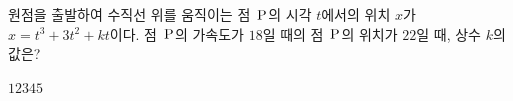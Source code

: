 원점을 출발하여 수직선 위를 움직이는 점~$\mathrm{P}$의 시각 $t$에서의 위치 $x$가 $x=t^3+3t^2+kt$이다. 점~$\mathrm{P}$의 가속도가 $18$일 때의 점~$\mathrm{P}$의 위치가 $22$일 때, 상수 $k$의 값은?
\begin{choices32}{$1$}{$2$}{$3$}{$4$}{$5$}\end{choices32}
